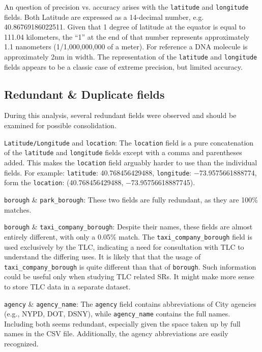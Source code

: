 \documentclass[linenumber]{jdsart}
\begin{document}
An question of precision vs. accuracy arises with the \texttt{latitude} 
and \texttt{longitude} fields. Both Latitude are expressed as 
a 14-decimal number, e.g. 40.86769186022511. Given 
that 1 degree of latitude at the equator is equal to 111.04 
kilometers, the ``1'' at the end of that number represents 
approximately 1.1 nanometers (1/1,000,000,000 of a meter). For 
reference a DNA molecule is approximately 2nm in width. The 
representation of the \texttt{latitude} and \texttt{longitude} fields appears to be a 
classic case of extreme precision, but limited accuracy. 


\subsection{Redundant \& Duplicate fields}
\label{sec:duplicates}

During this analysis, several redundant fields were observed and should 
be examined for possible consolidation.

\texttt{Latitude/Longitude} and \texttt{location}: The \texttt{location} field 
is a pure concatenation of the \texttt{latitude} and \texttt{longitude} fields except with a 
comma and parentheses added. This makes the \texttt{location} field 
arguably harder to use than the individual fields. For example:  
\texttt{latitude}: 40.768456429488, \texttt{longitude}: $-$73.9575661888774, 
form the \texttt{location}: (40.768456429488, $-$73.95756618887745).

\texttt{borough} \& \texttt{park\_borough}: These two fields are fully redundant, 
as they are 100\% matches.

\texttt{borough} \& \texttt{taxi\_company\_borough}: Despite their names, these 
fields are almost entirely different, with only a 0.05\% match. The 
\texttt{taxi\_company\_borough} field is used exclusively by the TLC, 
indicating a need for consultation with TLC to understand the differing 
uses. It is likely that that the usage of \texttt{taxi\_company\_borough}
is quite different than that of \texttt{borough}. Such information could be 
useful only when studying TLC related SRs. It might make more
sense to store TLC data in a separate dataset.

\texttt{agency} \& \texttt{agency\_name}: The \texttt{agency} field contains 
abbreviations of City agencies (e.g., NYPD, DOT, DSNY), while 
\texttt{agency\_name} contains the full names. Including both seems 
redundant, especially given the space taken up by full names in the 
CSV file. Additionally, the agency abbreviations are easily recognized.
\end{document}
